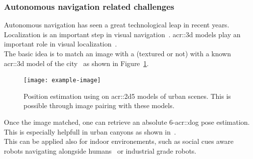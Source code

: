         \subsubsection{Autonomous navigation related challenges}
            Autonomous navigation has seen a great technological leap in recent years.
            Localization is an important step in visual navigation~\parencite{bonin2008visual}.
            \Gls{acr::3d} models play an important role in visual localization~\parencite{piasco2018survey, ijgi4042842}.\\
            The basic idea is to match an image with a (textured or not) with a known \gls{acr::3d} model of the city~\parencite{arth2015instant, ardeshir2014gis, cham2010estimating, christie2016semantics} as shown in Figure~\ref{fig::navigation}.
            \begin{figure}[htpb]
                \centering
                \texttt{[image: example-image]}            
                \caption{
                    \label{fig::navigation} Position estimation using on \gls{acr::2d5} models of urban scenes.
                    This is possible through image pairing with these models.
                }
            \end{figure}
            Once the image matched, one can retrieve an absolute 6-\gls{acr::dog} pose estimation.
            This is especially helpfull in urban canyons as shown in~\textcite{piasco2018survey}.\\
            This can be applied also for indoor environements, such as social cues aware robots navigating alongside humans~\parencite{gupta2018social} or industrial grade robots\addref.
       
